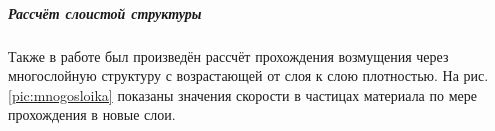 \subparagraph{Рассчёт слоистой структуры}
Также в работе был произведён рассчёт прохождения возмущения через многослойную структуру с возрастающей от слоя к слою плотностью. На рис.\ref{pic:mnogosloika} показаны значения скорости в частицах материала по мере прохождения в новые слои.

\begin{figure}
\begin{minipage}[h]{0.47\linewidth}
  \\
\end{minipage}
\hfill
\begin{minipage}[h]{0.47\linewidth}
 \\

\end{minipage}
\end{figure}
